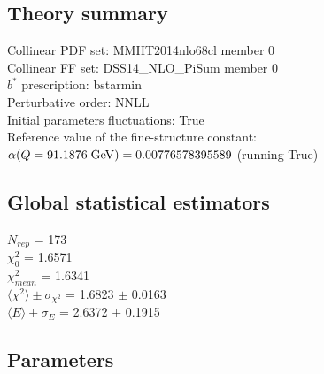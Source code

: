 \documentclass[
]{article}
\begin{document}
\hypertarget{theory-summary}{%
\subsection{Theory summary}\label{theory-summary}}

Collinear PDF set: MMHT2014nlo68cl member 0\\
Collinear FF set: DSS14\_NLO\_PiSum member 0\\
\(b^*\) prescription: bstarmin\\
Perturbative order: NNLL\\
Initial parameters fluctuations: True\\
Reference value of the fine-structure constant:
\(\alpha(Q = 91.1876\;{\rm GeV}) = 0.00776578395589\) (running True)

\hypertarget{global-statistical-estimators}{%
\subsection{Global statistical
estimators}\label{global-statistical-estimators}}

\(N_{rep}\) = 173\\
\(\chi_{0}^2\) = 1.6571\\
\(\chi_{mean}^2\) = 1.6341\\
\(\langle\chi^2\rangle \pm \sigma_{\chi^2}\) = 1.6823 \(\pm\) 0.0163\\
\(\langle E \rangle \pm \sigma_{E}\) = 2.6372 \(\pm\) 0.1915

\hypertarget{parameters}{%
\subsection{Parameters}\label{parameters}}
\end{document}
